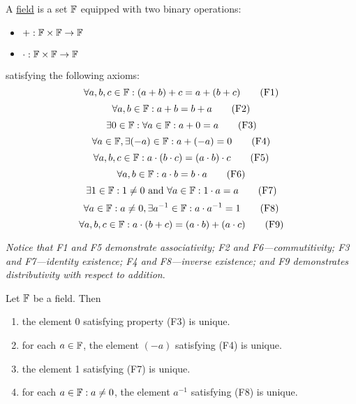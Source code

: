 \begin{mydef}
\normalfont A \underline{field} is a set \(\mathbb{F}\) equipped with two binary operations: 
\begin{itemize}
	\item \(+: \mathbb{F} \times \mathbb{F} \to \mathbb{F}\)
	\item \(\cdot: \mathbb{F} \times \mathbb{F} \to \mathbb{F}\)
\end{itemize}
%
satisfying the following axioms:
\begin{equation}\forall a,b,c \in \mathbb{F} : (a + b) + c = a + (b + c) \tag{F1}\end{equation}
\begin{equation}\forall a,b \in \mathbb{F} : a + b = b + a \tag{F2} \end{equation}
\begin{equation}\exists 0 \in \mathbb{F} : \forall a \in \mathbb{F} : a + 0 = a \tag{F3}\end{equation}
\begin{equation}\forall a \in \mathbb{F}, \exists(-a)\in\mathbb{F}:a+(-a)=0 \tag{F4}\end{equation}
%
\begin{equation}\forall a,b,c\in\mathbb{F} : a\cdot(b \cdot c) = (a \cdot b) \cdot c \tag{F5}\end{equation}
\begin{equation}\forall a,b\in\mathbb{F} : a \cdot b = b \cdot a \tag{F6}\end{equation}
\begin{equation}\exists 1\in\mathbb{F} : 1 \ne 0 \text{ and } \forall a\in\mathbb{F} : 1\cdot a = a \tag{F7}\end{equation}
\begin{equation}\forall a\in\mathbb{F} : a\ne 0, \exists a^{-1} \in \mathbb{F} : a\cdot a^{-1} = 1 \tag{F8}\end{equation}
%
\begin{equation}\forall a,b,c\in\mathbb{F}:a\cdot(b+c) = (a\cdot b) + (a\cdot c) \tag{F9}\end{equation}

\textit{Notice that F1 and F5 demonstrate associativity; F2 and F6---commutitivity; F3 and F7---identity existence; F4 and F8---inverse existence; and F9 demonstrates distributivity with respect to addition}.
\end{mydef}

\begin{mythm}\normalfont
Let \(\mathbb{F}\) be a field. Then
\begin{enumerate}
	\item the element 0 satisfying property (F3) is unique.
	\item for each \(a \in \mathbb{F}\), the element \((-a)\) satisfying (F4) is unique.
	\item the element 1 satisfying (F7) is unique.
	\item for each \(a\in\mathbb{F} : a \ne 0\), the element \(a^{-1}\) satisfying (F8) is unique.
\end{enumerate}
\end{mythm}

